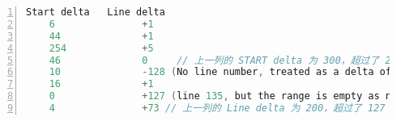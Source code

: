 \begin{lstlisting}[language=C, numbers=left, numbersep=1em, numberstyle=\footnotesize , breaklines=true]
    Start delta   Line delta
    6               +1
    44              +1
    254             +5
    46              0     // 上一列的 START delta 为 300，超过了 254 的上限，所以需要分解为 254 + 46 两列
    10              -128 (No line number, treated as a delta of zero)
    16              +1
    0               +127 (line 135, but the range is empty as no bytecodes are at line 135)
    4               +73 // 上一列的 Line delta 为 200，超过了 127 的上限，所以需要分解为 127 + 73 两列
\end{lstlisting}














